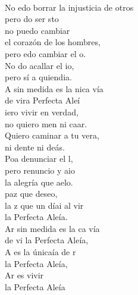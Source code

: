 \documentclass[12pt]{article}
\begin{document}
\begin{multicols*}{2}
\begin{cancion}%
	   \chord{(}{**)}{    }\\
	No edo borrar la injusticia de otros\\
	pero do ser sto \\
no puedo cambiar \\
el corazón de los hombres, \\
	pero edo cambiar el o. \\
	No do acallar el io, \\
	pero sí  a quiendia.\\
	A sin medida es la nica vía \\
	de vira Perfecta Aleí  \chord{(}{**)}{    }\\
\jump
	iero vivir en verdad, \\
	no quiero men ni caar.\\
Quiero caminar a tu vera,\\
	ni dente ni deás.\\
	Poa denunciar el l,  \\
	pero renuncio y aio \\
	la alegría que aelo.\\
	paz que deseo, \\
	la z que un díai al vir\\
	la Perfecta Aleía.   \chord{(}{**)}{    }\\
\jump
	Ar sin medida es la ca vía \\
	de vi la Perfecta Aleía,\\
	A es la únicaía de r \\
	la Perfecta Aleía,\\
	Ar es vivir  \\
	la Perfecta Aleía  \chord{(}{**)}{    }\\
\end{cancion}%


\end{multicols*}
\end{document}
